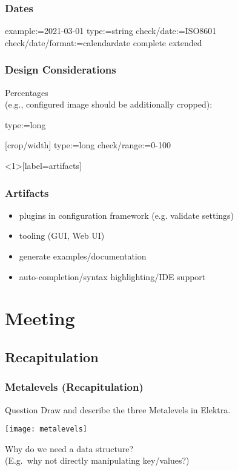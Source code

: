 \begin{frame}[fragile]
	\frametitle{Dates}
	\small
	\begin{code}[morekeywords={type,date,format,example},gobble=4]
	[mydate]
	example:=2021-03-01
	type:=string
	check/date:=ISO8601
	check/date/format:=calendardate complete extended
	\end{code}
\end{frame}

\begin{frame}[fragile]
	\frametitle{Design Considerations}
	Percentages
	\\ (e.g., configured image should be additionally cropped):
	\begin{code}
	type:=long

	[crop/width]
	type:=long
	check/range:=0-100
	\end{code}
\end{frame}

\begin{frame}<1>[label=artifacts]
	\frametitle{Artifacts}
	\begin{itemize}
	\item plugins in configuration framework (e.g. validate settings)
	\item tooling (GUI, Web UI)
	\item generate examples/documentation
	\item auto-completion/syntax highlighting/IDE support
	\end{itemize}
\end{frame}




\section{Meeting}
\subsection{Recapitulation}

\begin{frame}
	\frametitle{Metalevels (Recapitulation)}
	\begin{alertblock}{Question}
	Draw and describe the three Metalevels in Elektra.
	\end{alertblock}

	\pause
	\texttt{[image: metalevels]}
\end{frame}

\begin{assignment}
	\begin{task}
	Why do we need a data structure? \\
	(E.g.\ why not directly manipulating key/values?)
	\end{task}
\end{assignment}

